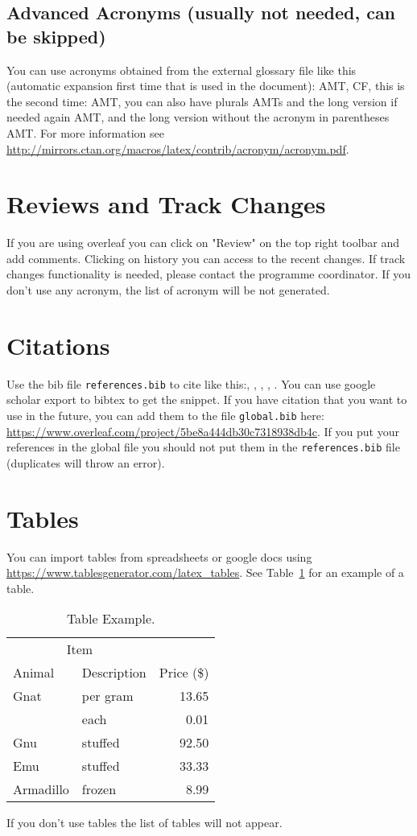 \subsection*{Advanced Acronyms (usually not needed, can be skipped)}
You can use acronyms obtained from the external glossary file like this (automatic expansion first time that is used in the document): \ac{AMT}, \ac{CF}, this is the second time: \ac{AMT}, you can also have plurals \acp{AMT} and the long version if needed again \acf{AMT}, and the long version without the acronym in parentheses \acl{AMT}.
 For more information see \url{http://mirrors.ctan.org/macros/latex/contrib/acronym/acronym.pdf}.
\section{Reviews and Track Changes}
If you are using overleaf you can click on "Review" on the top right toolbar and add comments. Clicking on history you can access to the recent changes.
If track changes functionality is needed, please contact the programme coordinator.
If you don't use any acronym, the list of acronym will be not generated.


\section{Citations}
Use the bib file \verb|references.bib| to cite like this:\cite{DeferredRouting}, \cite{olsrorg}, \citeauthor{bellalta2016interactions}, \citep{bellalta2016interactions}, \citet{bellalta2016interactions}. You can use google scholar export to bibtex to get the snippet.
If you have citation that you want to use in the future, you can add them to the file \verb|global.bib| here: \url{https://www.overleaf.com/project/5be8a444db30c7318938db4c}.  If you put your references in the global file you should not put them in the \verb|references.bib| file (duplicates will throw an error).

\section{Tables}
You can import tables from spreadsheets or google docs using \url{https://www.tablesgenerator.com/latex_tables}.
See Table~\ref{tab:ex} for an example of a table.
\begin{table}\centering
{} %
\begin{tabular}{@{}llr@{}} \toprule
\multicolumn{2}{c}{Item} \\ \cmidrule(r){1-2}
Animal & Description & Price (\$)\\ \midrule
Gnat & per gram & 13.65 \\
& each & 0.01 \\
Gnu & stuffed & 92.50 \\
Emu & stuffed & 33.33 \\
Armadillo & frozen & 8.99 \\ \bottomrule
\end{tabular}
\caption{Table Example.}\label{tab:ex}
\end{table}
If you don't use tables the list of tables will not appear.

